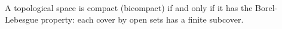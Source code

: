 A topological space is compact (bicompact) if and only if it has the Borel-Lebesgue property: each cover by open sets has a finite subcover.
